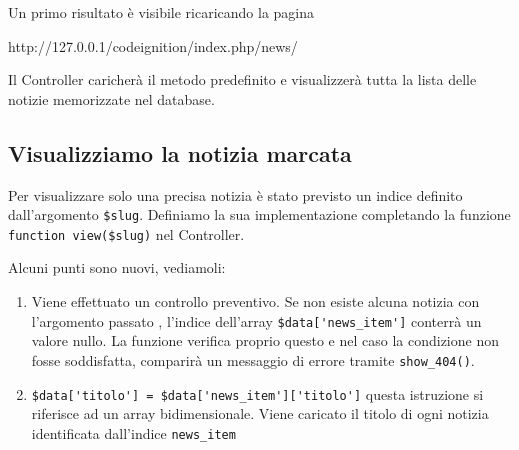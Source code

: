 
Un primo risultato è visibile ricaricando la pagina
\begin{code}
http://127.0.0.1/codeignition/index.php/news/
\end{code}

Il Controller caricherà il metodo predefinito e visualizzerà tutta la lista delle notizie memorizzate nel database. 

\subsection{Visualizziamo la notizia marcata}
Per visualizzare solo una precisa notizia è stato previsto un indice definito dall'argomento \verb|$slug|. Definiamo la sua implementazione completando la funzione \verb|function view($slug)| nel Controller.


Alcuni punti sono nuovi, vediamoli:

\begin{enumerate}
\item Viene effettuato un controllo preventivo. Se non esiste alcuna notizia con l'argomento passato , l'indice dell'array \verb|$data['news_item']| conterrà un valore nullo. La funzione  verifica proprio questo e nel caso la condizione non fosse soddisfatta, comparirà un messaggio di errore tramite \verb|show_404()|. 
\item \verb|$data['titolo'] = $data['news_item']['titolo']| questa istruzione si riferisce ad un array bidimensionale. Viene caricato il titolo di ogni notizia identificata dall'indice \verb|news_item|
\end{enumerate}

